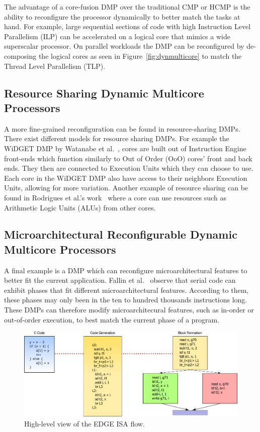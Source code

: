 The advantage of a core-fusion DMP over the traditional CMP or HCMP is the ability to reconfigure the processor dynamically to better match the tasks at hand.
For example, large sequential sections of code with high Instruction Level Parallelism (ILP) can be accelerated on a logical core that mimics a wide superscalar processor.
On parallel workloads the DMP can be reconfigured by de-composing the logical cores as seen in Figure~\ref{fig:dynmulticore} to match the Thread Level Parallelism (TLP).

\subsection{Resource Sharing Dynamic Multicore Processors}
A more fine-grained reconfiguration can be found in resource-sharing DMPs.
There exist different models for resource sharing DMPs.
For example the WiDGET DMP by Watanabe et al.~\cite{Watanabe2010Widget}, cores are built out of Instruction Engine front-ends which function similarly to Out of Order (OoO) cores' front and back ends.
They then are connected to Execution Units which they can choose to use.
Each core in the WiDGET DMP also have access to their neighbors Execution Units, allowing for more variation.
Another example of resource sharing can be found in Rodrigues et al.'s work~\cite{rodrigues2014perf} where a core can use resources such as Arithmetic Logic Units (ALUs) from other cores.

\subsection{Microarchitectural Reconfigurable Dynamic Multicore Processors}
A final example is a DMP which can reconfigure microarchitectural features to better fit the current application.
Fallin et al.~\cite{fallin} observe that serial code can exhibit phases that fit different microarchitectural features.
According to them, these phases may only been in the ten to hundred thousands instructions long.
These DMPs can therefore modify microarchitecural features, such as in-order or out-of-order execution, to best match the current phase of a program.

\begin{figure}[t]
    \centering
    \includegraphics[width=1\textwidth]{background/graphics/EDGE_3.pdf}
    \caption{High-level view of the EDGE ISA flow.}
    \label{fig:EdgeHigh}
\end{figure}

